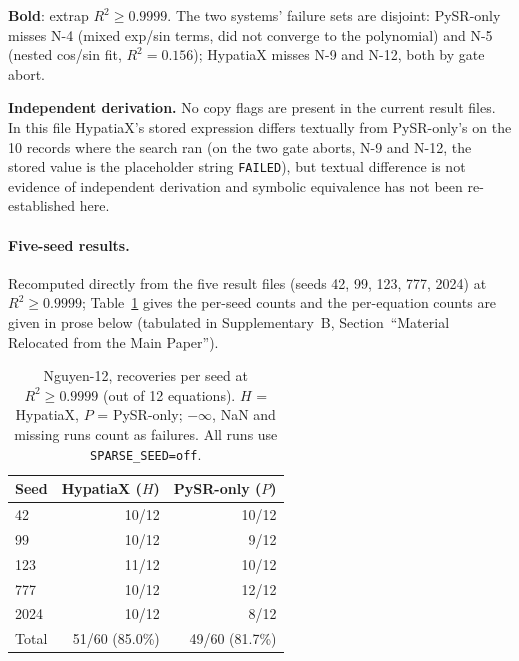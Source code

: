 \documentclass[twoside,11pt]{article}
\newcommand{\Rsq}{R^{2}}
\begin{document}
\begin{table}[h]
\begin{threeparttable}
\begin{tabular}{llrr}
\bottomrule
\end{tabular}
\begin{tablenotes}\small
  \item \textbf{Bold}: extrap $\Rsq \ge 0.9999$. The two systems' failure sets are
    disjoint: PySR-only misses N-4 (mixed exp/sin terms, did not converge to the
    polynomial) and N-5 (nested cos/sin fit, $\Rsq=0.156$); HypatiaX misses N-9
    and N-12, both by gate abort.
  \item[$\ddag$] \textbf{Independent derivation.} No copy flags are present in the current
    result files. In this file HypatiaX's stored expression differs textually from
    PySR-only's on the 10 records where the search ran (on the two gate aborts, N-9 and
    N-12, the stored value is the placeholder string \texttt{FAILED}), but textual difference is not evidence of
    independent derivation and symbolic equivalence has not been re-established here.
\end{tablenotes}
\end{threeparttable}
\end{table}

\paragraph{Five-seed results.} Recomputed directly from the
five result files (seeds 42, 99, 123, 777, 2024) at $\Rsq\ge0.9999$;
Table~\ref{tab:nguyen12_fiveseed} gives the per-seed counts and
the per-equation counts are given in prose below (tabulated in Supplementary~B, Section~``Material Relocated from the Main Paper'').

\begin{table}[h]
\centering
\caption{Nguyen-12, recoveries per seed at $\Rsq\ge0.9999$ (out of 12 equations). $H$ = HypatiaX, $P$ = PySR-only; $-\infty$, NaN and missing runs count as failures. All runs use \texttt{SPARSE\_SEED=off}.}
\label{tab:nguyen12_fiveseed}
\begin{tabular}{lrr}
\toprule
Seed & HypatiaX ($H$) & PySR-only ($P$) \\
\midrule
42 & 10/12 & 10/12 \\
99 & 10/12 & 9/12 \\
123 & 11/12 & 10/12 \\
777 & 10/12 & 12/12 \\
2024 & 10/12 & 8/12 \\
\midrule
Total & 51/60 (85.0\%) & 49/60 (81.7\%) \\
\bottomrule
\end{tabular}
\end{table}
\end{document}
